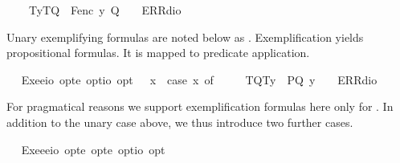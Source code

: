 \begin{isabellebody}
\ \ \ \ {\isacharparenleft}T{\isacharparenleft}y{\isacharparenright}{\isacharcomma}T{\isacharparenleft}Q{\isacharparenright}{\isacharparenright}\ {\isasymRightarrow}\ F{\isacharparenleft}enc\ y\ Q{\isacharparenright}\ {\isacharbar}\ {\isacharunderscore}\ {\isasymRightarrow}\ ERR{\isacharparenleft}dio{\isacharparenright}{\isachardoublequoteclose}%
\begin{isamarkuptext}%
Unary exemplifying formulas  are noted below as .  
  Exemplification yields propositional formulas. 
  It is mapped to predicate application.%
\end{isamarkuptext}%
\isamarkuptrue%
\ \isamarkupfalse%
\ Exe{}{\isacharcolon}{\isacharcolon}{\isachardoublequoteopen}{\isacharparenleft}e{\isasymRightarrow}io{\isacharparenright}\ opt{\isasymRightarrow}e\ opt{\isasymRightarrow}io\ opt{\isachardoublequoteclose}\ {\isacharparenleft}{\isachardoublequoteopen}{\isasymlparr}{\isacharunderscore}{\isacharcomma}{\isacharunderscore}{\isasymrparr}{\isachardoublequoteclose}{\isacharparenright}\ \ {\isachardoublequoteopen}{\isasymlparr}{\isasymPhi}{\isacharcomma}x{\isasymrparr}\ {\isasymequiv}\ case\ {\isacharparenleft}{\isasymPhi}{\isacharcomma}x{\isacharparenright}\ of\ \isanewline
\ \ \ \ {\isacharparenleft}T{\isacharparenleft}Q{\isacharparenright}{\isacharcomma}T{\isacharparenleft}y{\isacharparenright}{\isacharparenright}\ {\isasymRightarrow}\ P{\isacharparenleft}Q\ y{\isacharparenright}\ {\isacharbar}\ {\isacharunderscore}\ {\isasymRightarrow}\ ERR{\isacharparenleft}dio{\isacharparenright}{\isachardoublequoteclose}%
\begin{isamarkuptext}%
For pragmatical reasons we support exemplification formulas  here only for .
 In addition to the unary case above, we thus introduce two further cases.%
\end{isamarkuptext}%
\isamarkuptrue%
\ \isamarkupfalse%
\ Exe{}{\isacharcolon}{\isacharcolon}{\isachardoublequoteopen}{\isacharparenleft}e{\isasymRightarrow}e{\isasymRightarrow}io{\isacharparenright}\ opt{\isasymRightarrow}e\ opt{\isasymRightarrow}e\ opt{\isasymRightarrow}io\ opt{\isachardoublequoteclose}\ {\isacharparenleft}{\isachardoublequoteopen}{\isasymlparr}{\isacharunderscore}{\isacharcomma}{\isacharunderscore}{\isacharcomma}{\isacharunderscore}{\isasymrparr}{\isachardoublequoteclose}{\isacharparenright}\isanewline

\end{isabellebody}

